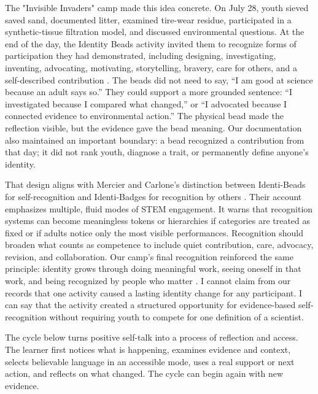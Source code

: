 \documentclass[11pt]{article}
\newcommand{\reviewsection}[1]{%
  \Needspace{4\baselineskip}
  \vspace{0.08in}\noindent{\normalsize\bfseries\color{PrimaryRed}#1}
  \par\vspace{0.025in}
}
\begin{document}
The "Invisible Invaders" camp made this idea concrete. On July 28, youth sieved saved sand, documented litter, examined tire-wear residue, participated in a synthetic-tissue filtration model, and discussed environmental questions. At the end of the day, the Identity Beads activity invited them to recognize forms of participation they had demonstrated, including designing, investigating, inventing, advocating, motivating, storytelling, bravery, care for others, and a self-described contribution \citep{campteam2026day3,campteam2026identity}. The beads did not need to say, ``I am good at science because an adult says so.'' They could support a more grounded sentence: ``I investigated because I compared what changed,'' or ``I advocated because I connected evidence to environmental action.'' The physical bead made the reflection visible, but the evidence gave the bead meaning. Our documentation also maintained an important boundary: a bead recognized a contribution from that day; it did not rank youth, diagnose a trait, or permanently define anyone's identity.

That design aligns with Mercier and Carlone's distinction between Identi-Beads for self-recognition and Identi-Badges for recognition by others \citep{mercier2021identibeads}. Their account emphasizes multiple, fluid modes of STEM engagement. It warns that recognition systems can become meaningless tokens or hierarchies if categories are treated as fixed or if adults notice only the most visible performances. Recognition should broaden what counts as competence to include quiet contribution, care, advocacy, revision, and collaboration. Our camp's final recognition reinforced the same principle: identity grows through doing meaningful work, seeing oneself in that work, and being recognized by people who matter \citep{campteam2026showcase}. I cannot claim from our records that one activity caused a lasting identity change for any participant. I can say that the activity created a structured opportunity for evidence-based self-recognition without requiring youth to compete for one definition of a scientist.

\reviewsection{The Evidence-Based Self-Talk Cycle}

The cycle below turns positive self-talk into a process of reflection and access. The learner first notices what is happening, examines evidence and context, selects believable language in an accessible mode, uses a real support or next action, and reflects on what changed. The cycle can begin again with new evidence.
\end{document}
